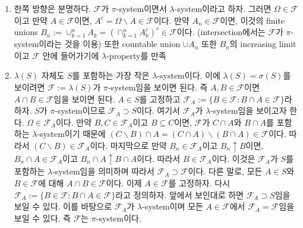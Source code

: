 \documentclass[
  13pt,
  letterpaper,
  DIV=11,
  numbers=noendperiod]{scrreprt}
\theoremstyle{plain}
\theoremstyle{definition}
\theoremstyle{definition}
\theoremstyle{plain}
\theoremstyle{definition}
\theoremstyle{plain}
\theoremstyle{remark}
\begin{document}
\begin{tcolorbox}[enhanced jigsaw, opacitybacktitle=0.6, bottomrule=.15mm, title=\textcolor{quarto-callout-note-color}{\faInfo}\hspace{0.5em}{Proof}, leftrule=.75mm, rightrule=.15mm, arc=.35mm, left=2mm, titlerule=0mm, colbacktitle=quarto-callout-note-color!10!white, bottomtitle=1mm, colframe=quarto-callout-note-color-frame, toptitle=1mm, coltitle=black, breakable, colback=white, toprule=.15mm, opacityback=0]

\begin{enumerate}
\def\labelenumi{\arabic{enumi}.}
\item
  한쪽 방향은 분명하다. \(\mathcal{F}\)가 \(\pi\)-system이면서
  \(\lambda\)-system이라고 하자. 그러면 \(\Omega \in \mathcal{F}\)이고
  만약 \(A\in \mathcal{F}\)이면,
  \(A^c = \Omega \backslash A \in \mathcal{F}\)이다. 만약
  \(A_n \in \mathcal{F}\)이면, 이것의 finite unions
  \(B_n := \cup_{k=1}^n A_k = (\cap_{k=1}^n A_k^c)^c \in \mathcal{F}\)이다.
  (intersection에서는 \(\mathcal{F}\)가 \(\pi\)-system이라는 것을 이용)
  또한 countable union \(\cup A_n\) 또한 \(B_n\)의 increasing limit이고
  \(\mathcal{F}\) 안에 들어가기에 \(\lambda\)-property를 만족
\item
  \(\lambda (S)\) 자체도 \(S\)를 포함하는 가장 작은
  \(\lambda\)-system이다. 이에 \(\lambda (S) = \sigma (S)\)를 보이려면
  \(\mathcal{F}:=\lambda (S)\)가 \(\pi\)-system임을 보이면 된다. 즉
  \(A, B \in \mathcal{F}\)이면 \(A\cap B \in \mathcal{F}\)임을 보이면
  된다. \(A\in S\)를 고정하고
  \(\mathcal{F}_A := \{ B \in \mathcal{F}: B \cap A \in \mathcal{F}\}\)라
  하자. \(S\)가 \(\pi\)-system이므로 \(\mathcal{F}_A \supset S\)이다.
  여기서 \(\mathcal{F}_A\)가 \(\lambda\)-system임을 보이고자 한다.
  \(\Omega \in \mathcal{F}_A\)이다. 만약 \(B, C \in \mathcal{F}_A\)이고
  \(B\subseteq C\)이면, \(\mathcal{F}\)가 \(C\cap A\)와 \(B\cap A\)를
  포함하는 \(\lambda\)-system이기 때문에
  \((C\backslash B) \cap A = (C \cap A) \backslash (B \cap A) \in \mathcal{F}\)이다.
  따라서 \((C\backslash B) \in \mathcal{F}_A\)이다. 마지막으로 만약
  \(B_n \in \mathcal{F}_A\)이고 \(B_n \uparrow B\)이면,
  \(B_n \cap A \in \mathcal{F}_A\)이고
  \(B_n \cap A \uparrow B \cap A\)이다. 따라서
  \(B \in \mathcal{F}_A\)이다. 이것은 \(\mathcal{F}_A\)가 \(S\)를
  포함하는 \(\lambda\)-system임을 의미하며 따라서
  \(\mathcal{F}_A \supset \mathcal{F}\)이다. 다른 말로, 모든
  \(A \in S\)와 \(B \in \mathcal{F}\)에 대해
  \(A \cap B \in \mathcal{F}\)이다. 이제 \(A\in\mathcal{F}\)를 고정하자.
  다시
  \(\mathcal{F}_A := \{ B\in \mathcal{F}: B\cap A \in \mathcal{F}\}\)라고
  정의하자. 앞에서 보인대로 하면 \(\mathcal{F}_A \supset S\)임을 보일 수
  있다. 이를 바탕으로 \(\mathcal{F}_A\)가 \(\lambda\)-system이며 모든
  \(A \in \mathcal{F}\)에서 \(\mathcal{F}_A = \mathcal{F}\)임을 보일 수
  있다. 즉 \(\mathcal{F}\)는 \(\pi\)-system이다.
\end{enumerate}

\end{tcolorbox}
\end{document}
